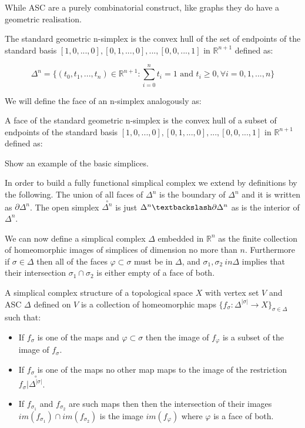 While ASC are a purely combinatorial construct, like graphs they do have a geometric realisation.

\begin{defn} The standard geometric n-simplex is the convex hull of the set of endpoints of the standard basis $[1, 0, ..., 0], [0, 1, ..., 0], ..., [0, 0, ..., 1]$ in $\mathbb{R}^{n+1}$ defined as: \end{defn}


$$ \Delta^n = \{(t_0, t_1, ..., t_n) \in \mathbb{R}^{n+1} : \sum_{i = 0}^{n} t_i  = 1 \text{ and } t_i \ge 0, \forall i = 0, 1, ..., n \} $$

We will define the face of an n-simplex analogously as:

\begin{defn} A face of the standard geometric n-simplex is the convex hull of a subset of endpoints of the standard basis $[1, 0, ..., 0], [0, 1, ..., 0], ..., [0, 0, ..., 1]$ in $\mathbb{R}^{n+1}$ defined as: \end{defn}

\begin{ex} Show an example of the basic simplices. \end{ex}



In order to build a fully functional simplical complex we extend by definitions by the following. The union of all faces of $\Delta^n$ is the boundary of $\Delta^n$ and it is written as $\partial \Delta^n$. The open simplex $\overset{\circ}{\Delta^n}$ is just $\Delta^n \textbackslash \partial \Delta^n$ as is the interior of $\Delta^n$.


We can now define a simplical complex $\Delta$ embedded in $\mathbb{R}^n$ as the finite collection of homeomorphic images of simplices of dimension no more than $n$. Furthermore if $\sigma \in \Delta$ then all of the faces $\varphi \subset \sigma$ must be in $\Delta$, and $\sigma_1, \sigma_2 \ in \Delta$ implies that their intersection $\sigma_1 \cap \sigma_2$ is either empty of a face of both.




A simplical complex structure of a topological space $X$ with vertex set $V$ and ASC $\Delta$ defined on $V$ is a collection of homeomorphic maps $\{f_\sigma : \Delta^{|\sigma|} \to X\}_{\sigma \in \Delta}$ such that:


\begin{itemize}
    \item If $f_\sigma$ is one of the maps and $\varphi \subset \sigma$ then the image of $f_\varphi$ is a subset of the image of $f_\sigma$.
    \item If $f_\sigma$ is one of the maps no other map maps to the image of the restriction $f_\sigma | \overset{\circ}{\Delta^{|\sigma|}}$.
    \item If $f_{\sigma_1}$ and $f_{\sigma_2}$ are such maps then then the intersection of their images $im(f_{\sigma_1}) \cap im(f_{\sigma_2})$ is the image $im(f_\varphi)$ where $\varphi$ is a face of both. 

\end{itemize}



